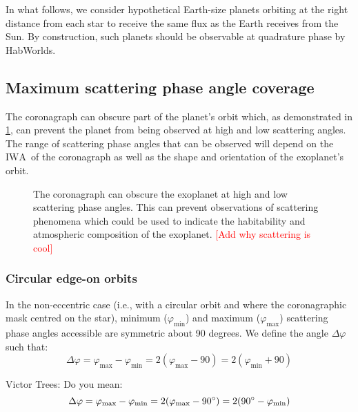 \documentclass[
    usenatbib,
]{mnras}
\newcommand{\todo}[1]{\textcolor{red}{[#1]}}
\newcommand{\IWA}{\ensuremath{\mathrm{IWA}}}
\begin{document}
In what follows, we consider hypothetical Earth-size planets orbiting at the right distance from each star to receive the same flux as the Earth receives from the Sun. By construction, such planets should be observable at quadrature phase by HabWorlds. 


\subsection{Maximum scattering phase angle coverage}
\label{sec:Delta_phi}

The coronagraph can obscure part of the planet's orbit which, as demonstrated in \cref{fig:annotated-orbit}, can prevent the planet from being observed at high and low scattering angles. 
%
The range of scattering phase angles that can be observed will depend on the \IWA\ of the coronagraph as well as the shape and orientation of the exoplanet's orbit.

\begin{figure}
    \centering
    
    \caption{
        The coronagraph can obscure the exoplanet at high and low scattering phase angles. This can prevent observations of scattering phenomena which could be used to indicate the habitability and atmospheric composition of the exoplanet. \todo{Add why scattering is cool} 
    }
    \label{fig:annotated-orbit}
\end{figure}


\subsubsection{Circular edge-on orbits}

In the non-eccentric case (i.e., with a circular orbit and where the coronagraphic mask centred on the star), minimum ($\varphi_\mathrm{min}$) and maximum ($\varphi_\mathrm{max}$) scattering phase angles accessible are symmetric about 90 degrees. 
%
We define the angle $\Delta \varphi$ such that: 
\begin{equation}
    \label{eq:Delta_phi}
    \Delta \varphi 
    = \varphi_\mathrm{max} - \varphi_\mathrm{min}
    =  2(\varphi_\mathrm{max} - 90) 
    =  2(\varphi_\mathrm{min} + 90)
\end{equation}

{\color{Green} Victor Trees: Do you mean:
%
\begin{equation}
    \Delta \varphi 
    = \varphi_\mathrm{max} - \varphi_\mathrm{min}
    =  2(\varphi_\mathrm{max} - 90^\circ) 
    =  2(90^\circ-\varphi_\mathrm{min} ) \notag
\end{equation}
%
} 
\end{document}
